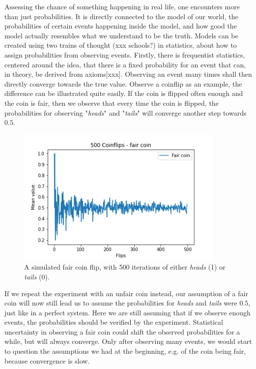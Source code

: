 Assessing the chance of something happening in real life, one encounters more than just probabilities. It is directly connected to the model of our world, the probabilities of certain events happening inside the model, and how good the model actually resembles what we understand to be the truth. Models can be created using two trains of thought (xxx schools?) in statistics, about how to assign probabilities from observing events. Firstly, there is frequentist statistics, centered around the idea, that there is a fixed probability for an event that can, in theory, be derived from axioms[xxx]. Observing an event many times shall then directly converge towards the true value. Observe a coinflip as an example, the difference can be illustrated quite easily. If the coin is flipped often enough and the coin is fair, then we observe that every time the coin is flipped, the probabilities for observing "\textit{heads}" and "\textit{tails}" will converge another step towards $0.5$. 
\begin{figure}[h!]%
	\centering
	\includegraphics[width=4in]{img/05_1/fair_coinflip.png}
	\caption[Fair Coinflip]
	{A simulated fair coin flip, with 500 iterations of either \textit{heads} (1) or \textit{tails} (0). }
\end{figure}
If we repeat the experiment with an unfair coin instead, our assumption of a fair coin will now still lead us to assume the probabilities for \textit{heads} and \textit{tails} were $0.5$, just like in a perfect system. Here we are still assuming that if we observe enough events, the probabilities should be verified by the experiment. Statistical uncertainty in observing a fair coin could shift the observed probabilities for a while, but will always converge. Only after observing many events, we would start to question the assumptions we had at the beginning, e.g. of the coin being fair, because convergence is slow. 
